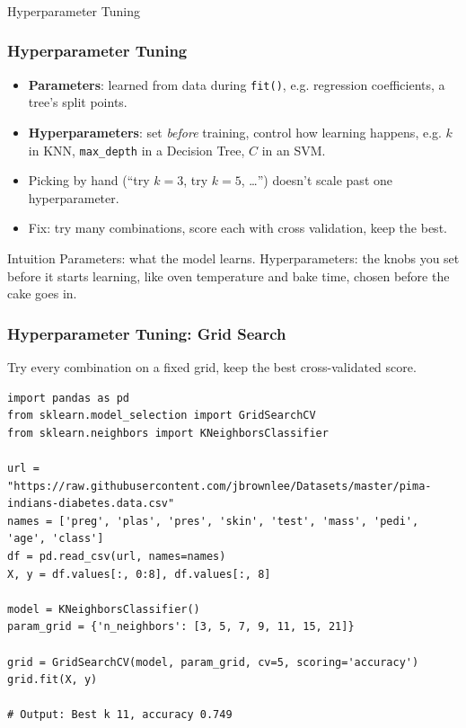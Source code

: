 \begin{frame}[fragile]\frametitle{}
\begin{center}
{\Large Hyperparameter Tuning}
\end{center}
\end{frame}

\begin{frame}[fragile]\frametitle{Hyperparameter Tuning}
\begin{itemize}
\item \textbf{Parameters}: learned from data during \texttt{fit()}, e.g. regression coefficients, a tree's split points.
\item \textbf{Hyperparameters}: set \emph{before} training, control how learning happens, e.g. $k$ in KNN, \texttt{max\_depth} in a Decision Tree, $C$ in an SVM.
\item Picking by hand (``try $k=3$, try $k=5$, \ldots'') doesn't scale past one hyperparameter.
\item Fix: try many combinations, score each with cross validation, keep the best.
\end{itemize}

\begin{block}{Intuition}
Parameters: what the model learns. Hyperparameters: the knobs you set before it starts learning, like oven temperature and bake time, chosen before the cake goes in.
\end{block}
\end{frame}

\begin{frame}[fragile]\frametitle{Hyperparameter Tuning: Grid Search}
Try every combination on a fixed grid, keep the best cross-validated score.
\begin{lstlisting}
import pandas as pd
from sklearn.model_selection import GridSearchCV
from sklearn.neighbors import KNeighborsClassifier

url = "https://raw.githubusercontent.com/jbrownlee/Datasets/master/pima-indians-diabetes.data.csv"
names = ['preg', 'plas', 'pres', 'skin', 'test', 'mass', 'pedi', 'age', 'class']
df = pd.read_csv(url, names=names)
X, y = df.values[:, 0:8], df.values[:, 8]

model = KNeighborsClassifier()
param_grid = {'n_neighbors': [3, 5, 7, 9, 11, 15, 21]}

grid = GridSearchCV(model, param_grid, cv=5, scoring='accuracy')
grid.fit(X, y)

# Output: Best k 11, accuracy 0.749
\end{lstlisting}
\end{frame}

